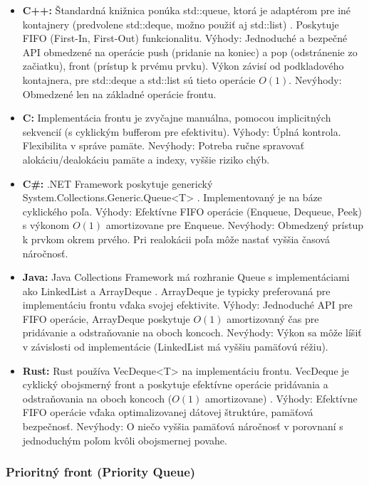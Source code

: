 \documentclass[11pt]{article}
\begin{document}
\begin{itemize}
  \item \textbf{C++:} Štandardná knižnica ponúka std::queue, ktorá je adaptérom pre iné kontajnery (predvolene std::deque, možno použiť aj std::list) \cite{c++_containers}. Poskytuje FIFO (First-In, First-Out) funkcionalitu.
  Výhody: Jednoduché a bezpečné API obmedzené na operácie push (pridanie na koniec) a pop (odstránenie zo začiatku), front (prístup k prvému prvku). Výkon závisí od podkladového kontajnera, pre std::deque a std::list sú tieto operácie $O(1)$.
  Nevýhody: Obmedzené len na základné operácie frontu.
  \item \textbf{C:} Implementácia frontu je zvyčajne manuálna, pomocou implicitných sekvencií (s cyklickým bufferom pre efektivitu).
  Výhody: Úplná kontrola. Flexibilita v správe pamäte.
  Nevýhody: Potreba ručne spravovať alokáciu/dealokáciu pamäte a indexy, vyššie riziko chýb.
  \item \textbf{C\#:} .NET Framework poskytuje generický System.Collections.Generic.Queue<T> \cite{dotnet_docs}. Implementovaný je na báze cyklického poľa.
  Výhody: Efektívne FIFO operácie (Enqueue, Dequeue, Peek) s výkonom $O(1)$ amortizovane pre Enqueue.
  Nevýhody: Obmedzený prístup k prvkom okrem prvého. Pri realokácii poľa môže nastať vyššia časová náročnosť.
  \item \textbf{Java:} Java Collections Framework má rozhranie Queue s implementáciami ako LinkedList a ArrayDeque \cite{java_docs}. ArrayDeque je typicky preferovaná pre implementáciu frontu vďaka svojej efektivite.
  Výhody: Jednoduché API pre FIFO operácie, ArrayDeque poskytuje $O(1)$ amortizovaný čas pre pridávanie a odstraňovanie na oboch koncoch.
  Nevýhody: Výkon sa môže líšiť v závislosti od implementácie (LinkedList má vyššiu pamäťovú réžiu).
  \item \textbf{Rust:} Rust používa VecDeque<T> na implementáciu frontu. VecDeque je cyklický obojsmerný front a poskytuje efektívne operácie pridávania a odstraňovania na oboch koncoch ($O(1)$ amortizovane) \cite{rust_collections}.
  Výhody: Efektívne FIFO operácie vďaka optimalizovanej dátovej štruktúre, pamäťová bezpečnosť.
  Nevýhody: O niečo vyššia pamäťová náročnosť v porovnaní s jednoduchým poľom kvôli obojsmernej povahe.
\end{itemize}

\subsubsection*{Prioritný front (Priority Queue)}
\end{document}

